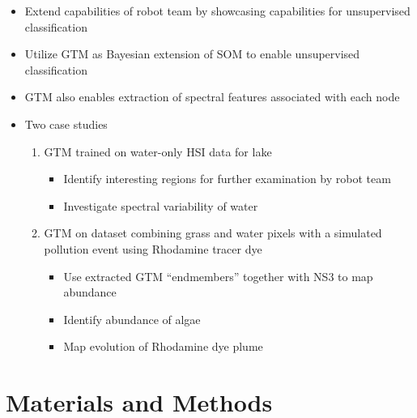 \documentclass[
  letterpaper,
  DIV=11,
  numbers=noendperiod]{scrartcl}
\providecommand{\tightlist}{%
  \setlength{\itemsep}{0pt}\setlength{\parskip}{0pt}}\usepackage{longtable,booktabs,array}
\begin{document}
\begin{enumerate}
  \begin{itemize}
  \tightlist
  \item
    Extend capabilities of robot team by showcasing capabilities for
    unsupervised classification
  \item
    Utilize GTM as Bayesian extension of SOM to enable unsupervised
    classification
  \item
    GTM also enables extraction of spectral features associated with
    each node
  \item
    Two case studies

    \begin{enumerate}
    \def\labelenumii{\arabic{enumii}.}
    \tightlist
    \item
      GTM trained on water-only HSI data for lake

      \begin{itemize}
      \tightlist
      \item
        Identify interesting regions for further examination by robot
        team
      \item
        Investigate spectral variability of water
      \end{itemize}
    \item
      GTM on dataset combining grass and water pixels with a simulated
      pollution event using Rhodamine tracer dye

      \begin{itemize}
      \tightlist
      \item
        Use extracted GTM ``endmembers'' together with NS3 to map
        abundance
      \item
        Identify abundance of algae
      \item
        Map evolution of Rhodamine dye plume
      \end{itemize}
    \end{enumerate}
  \end{itemize}
\end{enumerate}

\section{Materials and Methods}\label{materials-and-methods}
\end{document}
